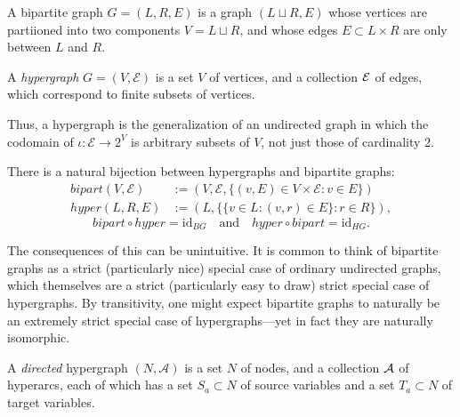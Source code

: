 \begin{defn}
    A bipartite graph $G = (L, R, E)$ is a graph $(L \sqcup R, E)$ whose
    vertices are partiioned into two components $V = L \sqcup R$, 
    and whose edges $E \subset L \times R$ are only between $L$ and $R$. 
\end{defn}




\begin{defn}
    A \emph{hypergraph} $G = (V, \mathcal E)$ is a set $V$ of vertices,
    and a collection $\cal E$ of edges, which correspond to finite
    subsets of vertices. 
\end{defn}

Thus, a hypergraph is the generalization of an undirected graph in which the codomain of $\iota : \mathcal E \to 2^V$ is arbitrary subsets of $V$, not just those of cardinality 2. 


\begin{prop} 
There is a natural bijection between hypergraphs and bipartite graphs:
\def\bigr{\mathit{bipart}}
\def\hygr{\mathit{hyper}}
\begin{align*}
    \bigr(V, \mathcal E) &:=  (V, \mathcal E, \{(v, E) \in V \times \mathcal E : v \in E \} ) \\
    \hygr(L, R, E) &:= (L, \{\{v \in L : (v,r) \in E\} : r \in R\}),
\end{align*}    
    \[
        \bigr \circ \hygr = \mathrm{id}_{BG}
        \quad\text{and}\quad
        \hygr \circ \bigr = \mathrm{id}_{HG}.
    \]
\end{prop}

The consequences of this can be unintuitive.
It is common to think of bipartite graphs as a strict (particularly nice) special case of ordinary undirected graphs, which themselves are a strict (particularly easy to draw) strict special case of hypergraphs.  
By transitivity, one might expect bipartite graphs to naturally be an extremely strict special case of hypergraphs---yet in fact they are naturally isomorphic. 

\begin{defn}
    A \emph{directed} hypergraph $(N, \mathcal A)$ is a set $N$ of nodes,
    and a collection $\mathcal A$ of hyperarcs, each of which has a set $S_a \subset N$ of
    source variables and a set $T_a \subset N$ of target variables.        
\end{defn}

